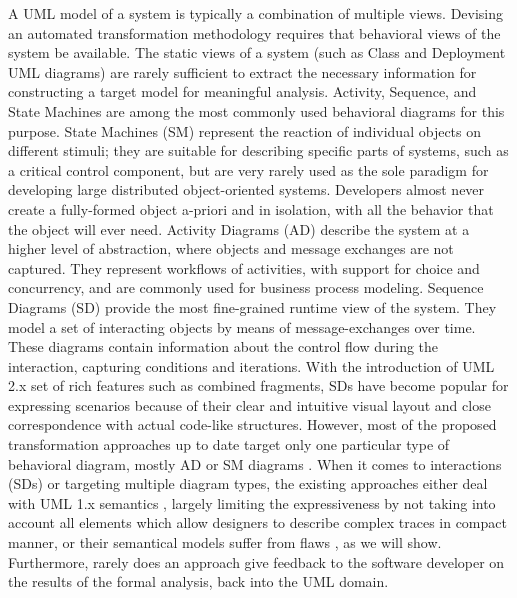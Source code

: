 \documentclass[letter]{llncs}
\begin{document}
A UML model of a system is typically a combination of multiple views. 
Devising an automated transformation
methodology 
requires that behavioral views of the system be available. The static views of
a system (such as Class and Deployment UML diagrams) are rarely sufficient to
extract the necessary information for constructing a target model for meaningful analysis. 
Activity, Sequence, and State Machines are among the most commonly used behavioral diagrams
for this purpose.
State Machines (SM) represent the reaction of individual objects on different stimuli;
they are suitable for describing 
specific parts of systems, such as a critical control component, but are very
rarely used \cite{inpJuDuJuLaPo06a} as the sole paradigm for developing large
distributed object-oriented systems. Developers almost never
create a fully-formed object a-priori and in isolation, with all the behavior that the object will ever
need.
Activity Diagrams (AD) describe the system at a higher level of
abstraction, where objects and message exchanges are not captured. They represent 
workflows of activities, with support for choice and concurrency, and 
are commonly used for business process modeling. 
Sequence Diagrams (SD) provide the most fine-grained runtime view of
the system. 
They model a set of interacting objects by means of message-exchanges over time.
These diagrams contain information about the control flow during the
interaction, capturing 
conditions and iterations. With the introduction of UML 2.x set of rich features
such as combined fragments, SDs have become popular for expressing scenarios because of their clear
and intuitive visual layout and close correspondence with actual code-like
structures. 
However,
most of the proposed transformation approaches up to date target only one
particular type of
behavioral diagram, mostly AD or SM diagrams
\cite{Tribastone:2008:AEP:1383559.1383569,inpJuDuJuLaPo06a,Cao:2006:TMV:1169227.1169783,Siveroni:2008:PSS:1371602.1371879}. When it comes
to
interactions (SDs) or targeting multiple diagram types, the existing approaches either deal with UML 1.x
semantics \cite{Tribastone:2008:ATU:1446304.1447447,sarma1,Rasch:2005:CVS:2144745.2144752,GallardoMP02,pokozy-korenblat_04_toward}, 
largely limiting the expressiveness by not taking into account
all
elements which allow designers to describe complex traces in compact manner, 
or their semantical models suffer from flaws
\cite{Tribastone:2008:ATU:1446304.1447447,pokozy-korenblat_04_toward}, as we will show.
Furthermore, rarely \cite{Hansen:2010:AVE:2188418.2188435} does an approach give feedback to the software developer 
on the results of the formal analysis, back into the UML domain. 
\end{document}
